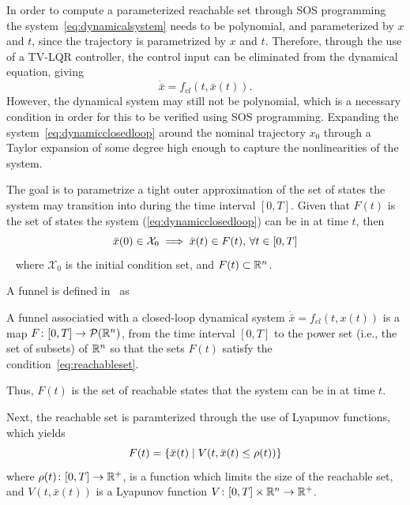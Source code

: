 In order to compute a parameterized reachable set through \ac{SOS} programming
the system~\ref{eq:dynamicalsystem} needs to be polynomial, and parameterized by
\(x\) and \(t\), since the trajectory is parametrized by \(x\) and \(t\).
Therefore, through the use of a \ac{TV-LQR} controller, the control input can be
eliminated from the dynamical equation, giving
\begin{equation}
  \label{eq:dynamicclosedloop}
  \dot{\bar{x}} = f_{cl}(t,\bar{x}(t)).
\end{equation}
However, the dynamical system may still not be polynomial, which is a necessary
condition in order for this to be verified using \ac{SOS} programming. Expanding
the system~\ref{eq:dynamicclosedloop} around the nominal trajectory \(x_0\)
through a Taylor expansion of some degree high enough to capture the
nonlinearities of the system.

The goal is to parametrize a tight outer approximation of the set of states the
system may transition into during the time interval \([0,T]\). Given that
\(F(t)\) is the set of states the system (\ref{eq:dynamicclosedloop}) can be in
at time \(t\), then
\begin{equation}
  \label{eq:reachableset}
  \bar{x}(0) \in \mathcal{X}_0 \implies \bar{x}(t) \in F(t), \, \forall t \in [0,T]
\end{equation}~\cite{majumdarFunnelLibrariesRealtime2017} 
where \(\mathcal{X}_0\) is the initial condition set, and \(F(t) \subset \mathbb{R}^n\).

A funnel is defined in~\cite{majumdarFunnelLibrariesRealtime2017} as
\begin{definition}
  \label{def:funnel}
  A funnel associatied with a closed-loop dynamical system \(\dot{\bar{x}} =
  f_{cl}(t,x(t))\) is a map \(F \colon [0,T] \rightarrow \mathcal{P}(\mathbb{R}^n)\),
  from the time interval \([0,T]\) to the power set (i.e., the set of subsets)
  of \(\mathbb{R}^n\) so that the sets \(F(t)\) satisfy the
  condition~\ref{eq:reachableset}.
\end{definition}
Thus, \(F(t)\) is the set of reachable states that the system can be in at time
\(t\).

Next, the reachable set is paramterized through the use of Lyapunov functions,
which yields
\begin{equation}
  F(t) = \lbrace\bar{x}(t) \mid V(t, \bar{x}(t) \leq \rho (t))\rbrace
\end{equation}
where \(\rho (t) \colon [0,T] \rightarrow \mathbb{R}^+\), is a function which limits the
size of the reachable set, and \(V(t,\bar{x}(t))\) is a Lyapunov function \(V
\colon [0,T] \times \mathbb{R}^n \rightarrow \mathbb{R}^+\).

